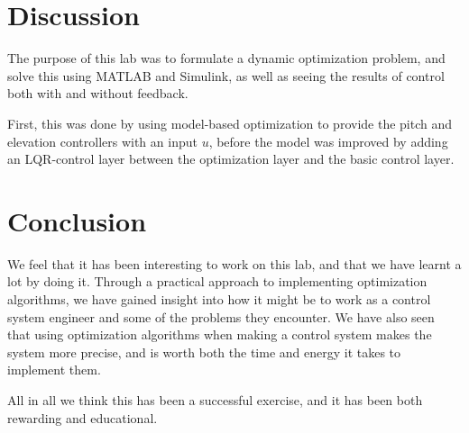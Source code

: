 \section{Discussion}
The purpose of this lab was to formulate a dynamic optimization problem, and solve this using MATLAB and Simulink, as well as seeing the results of control both with and without feedback.

First, this was done by using model-based optimization to provide the pitch and elevation controllers with an input $u$, before the model was improved by adding an LQR-control layer between the optimization layer and the basic control layer. 


\section{Conclusion}
We feel that it has been interesting to work on this lab, and that we have learnt a lot by doing it. Through a practical approach to implementing optimization algorithms, we have gained insight into how it might be to work as a control system engineer and some of the problems they encounter. 
We have also seen that using optimization algorithms when making a control system makes the system more precise, and is worth both the time and energy it takes to implement them. 

All in all we think this has been a successful exercise, and it has been both rewarding and educational.